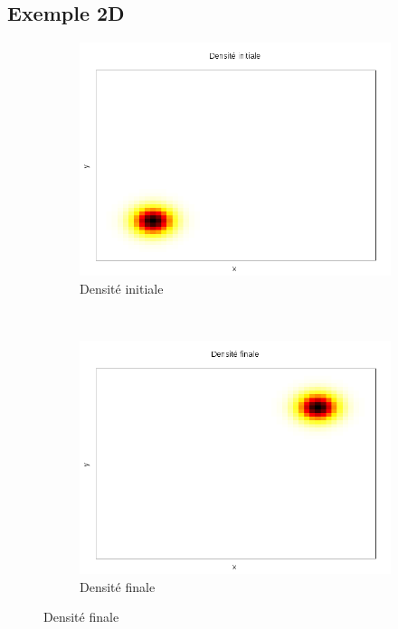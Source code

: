 \documentclass{beamer}
\begin{document}
\subsection{Exemple 2D}
\begin{frame}
\begin{figure}[!h]
\centering 
\hspace{-0.5cm}
	\begin{subfigure}[b]{0.3\linewidth}
	\includegraphics[width=\textwidth]{img/2DGaussian/f0.png}
	\caption{Densité initiale}
	\end{subfigure}
	~
	\begin{subfigure}[b]{0.3\linewidth}
	\includegraphics[width=\textwidth]{img/2DGaussian/f1.png}
	\caption{Densité finale}

\end{subfigure}
\end{figure}
\end{frame}
\end{document}
